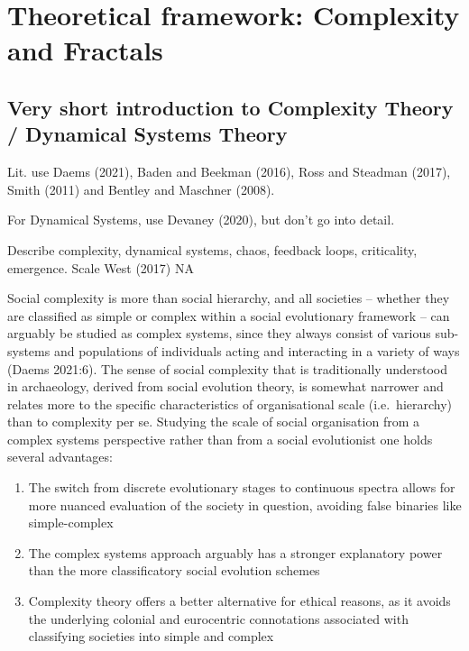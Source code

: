 \documentclass[
  12pt,
]{book}
\begin{document}
\hypertarget{theory}{%
\chapter{Theoretical framework: Complexity and Fractals}\label{theory}}

\hypertarget{very-short-introduction-to-complexity-theory-dynamical-systems-theory}{%
\section{Very short introduction to Complexity Theory / Dynamical Systems Theory}\label{very-short-introduction-to-complexity-theory-dynamical-systems-theory}}

Lit. use Daems (2021), Baden and Beekman (2016), Ross and Steadman (2017), Smith (2011) and Bentley and Maschner (2008).

For Dynamical Systems, use Devaney (2020), but don't go into detail.

Describe complexity, dynamical systems, chaos, feedback loops, criticality, emergence. Scale West (2017) NA

Social complexity is more than social hierarchy, and all societies -- whether they are classified as simple or complex within a social evolutionary framework -- can arguably be studied as complex systems, since they always consist of various sub-systems and populations of individuals acting and interacting in a variety of ways (Daems 2021:6). The sense of social complexity that is traditionally understood in archaeology, derived from social evolution theory, is somewhat narrower and relates more to the specific characteristics of organisational scale (i.e.~hierarchy) than to complexity per se. Studying the scale of social organisation from a complex systems perspective rather than from a social evolutionist one holds several advantages:

\begin{enumerate}
\def\labelenumi{\arabic{enumi}.}
\item
  The switch from discrete evolutionary stages to continuous spectra allows for more nuanced evaluation of the society in question, avoiding false binaries like simple-complex
\item
  The complex systems approach arguably has a stronger explanatory power than the more classificatory social evolution schemes
\item
  Complexity theory offers a better alternative for ethical reasons, as it avoids the underlying colonial and eurocentric connotations associated with classifying societies into simple and complex
\end{enumerate}
\end{document}
